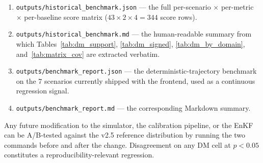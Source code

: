 \documentclass[12pt]{article}
\begin{document}
\begin{enumerate}
    \item \texttt{outputs/historical\_benchmark.json} --- the full per-scenario $\times$ per-metric $\times$ per-baseline score matrix ($43 \times 2 \times 4 = 344$ score rows).
    \item \texttt{outputs/historical\_benchmark.md} --- the human-readable summary from which Tables~\ref{tab:dm_support}, \ref{tab:dm_signed}, \ref{tab:dm_by_domain}, and~\ref{tab:matrix_cov} are extracted verbatim.
    \item \texttt{outputs/benchmark\_report.json} --- the deterministic-trajectory benchmark on the 7 scenarios currently shipped with the frontend, used as a continuous regression signal.
    \item \texttt{outputs/benchmark\_report.md} --- the corresponding Markdown summary.
\end{enumerate}

Any future modification to the simulator, the calibration pipeline, or the EnKF can be A/B-tested against the v2.5 reference distribution by running the two commands before and after the change. Disagreement on any DM cell at $p < 0.05$ constitutes a reproducibility-relevant regression.
\end{document}
